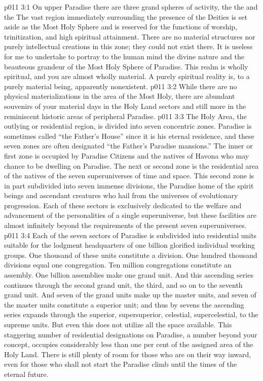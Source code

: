 %
\vs p011 3:1 On upper Paradise there are three grand spheres of activity, the  the  and the  The vast region immediately surrounding the presence of the Deities is set aside as the Most Holy Sphere and is reserved for the functions of worship, trinitization, and high spiritual attainment. There are no material structures nor purely intellectual creations in this zone; they could not exist there. It is useless for me to undertake to portray to the human mind the divine nature and the beauteous grandeur of the Most Holy Sphere of Paradise. This realm is wholly spiritual, and you are almost wholly material. A purely spiritual reality is, to a purely material being, apparently nonexistent.
\vs p011 3:2 While there are no physical materializations in the area of the Most Holy, there are abundant souvenirs of your material days in the Holy Land sectors and still more in the reminiscent historic areas of peripheral Paradise.
\vs p011 3:3 The Holy Area, the outlying or residential region, is divided into seven concentric zones. Paradise is sometimes called “the Father’s House” since it is his eternal residence, and these seven zones are often designated “the Father’s Paradise mansions.” The inner or first zone is occupied by Paradise Citizens and the natives of Havona who may chance to be dwelling on Paradise. The next or second zone is the residential area of the natives of the seven superuniverses of time and space. This second zone is in part subdivided into seven immense divisions, the Paradise home of the spirit beings and ascendant creatures who hail from the universes of evolutionary progression. Each of these sectors is exclusively dedicated to the welfare and advancement of the personalities of a single superuniverse, but these facilities are almost infinitely beyond the requirements of the present seven superuniverses.
\vs p011 3:4 Each of the seven sectors of Paradise is subdivided into residential units suitable for the lodgment headquarters of one billion glorified individual working groups. One thousand of these units constitute a division. One hundred thousand divisions equal one congregation. Ten million congregations constitute an assembly. One billion assemblies make one grand unit. And this ascending series continues through the second grand unit, the third, and so on to the seventh grand unit. And seven of the grand units make up the master units, and seven of the master units constitute a superior unit; and thus by sevens the ascending series expands through the superior, supersuperior, celestial, supercelestial, to the supreme units. But even this does not utilize all the space available. This staggering number of residential designations on Paradise, a number beyond your concept, occupies considerably less than one per cent of the assigned area of the Holy Land. There is still plenty of room for those who are on their way inward, even for those who shall not start the Paradise climb until the times of the eternal future.
